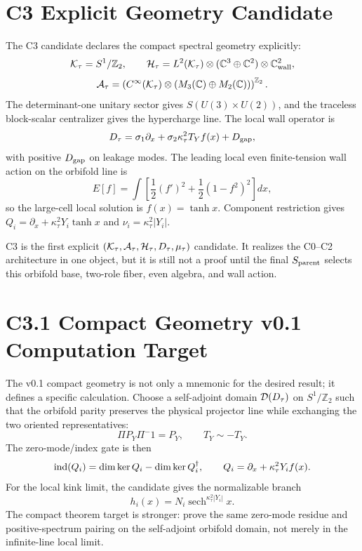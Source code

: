 \documentclass[11pt]{article}
\begin{document}
\section{C3 Explicit Geometry Candidate}
The C3 candidate declares the compact spectral geometry explicitly:
\begin{equation}
{\cal K}_\tau=S^1/\mathbb Z_2,\qquad
{\cal H}_\tau=
L^2({\cal K}_\tau)\otimes
(\mathbb C^3\oplus\mathbb C^2)\otimes\mathbb C^2_{\rm wall},
\end{equation}
\begin{equation}
{\cal A}_\tau=
\left(C^\infty({\cal K}_\tau)\otimes
(M_3(\mathbb C)\oplus M_2(\mathbb C))\right)^{\mathbb Z_2} .
\end{equation}
The determinant-one unitary sector gives $S(U(3)\times U(2))$, and the
traceless block-scalar centralizer gives the hypercharge line.  The local wall
operator is
\begin{equation}
D_\tau=\sigma_1\partial_x+\sigma_2\kappa_\tau^2T_Y f(x)+D_{\rm gap},
\end{equation}
with positive $D_{\rm gap}$ on leakage modes.  The leading local even
finite-tension wall action on the orbifold line is
\begin{equation}
E[f]=\int\left[\frac12(f')^2+\frac12(1-f^2)^2\right]dx,
\end{equation}
so the large-cell local solution is $f(x)=\tanh x$.  Component restriction gives
$Q_i=\partial_x+\kappa_\tau^2Y_i\tanh x$ and
$\nu_i=\kappa_\tau^2|Y_i|$.

C3 is the first explicit $({\cal K}_\tau,{\cal A}_\tau,{\cal H}_\tau,D_\tau,\mu_\tau)$
candidate.  It realizes the C0--C2 architecture in one object, but it is still
not a proof until the final $S_{\rm parent}$ selects this orbifold base,
two-role fiber, even algebra, and wall action.

\section{C3.1 Compact Geometry v0.1 Computation Target}
The v0.1 compact geometry is not only a mnemonic for the desired result; it
defines a specific calculation.  Choose a self-adjoint domain
${\cal D}(D_\tau)$ on $S^1/\mathbb Z_2$ such that the orbifold parity
preserves the physical projector line while exchanging the two oriented
representatives:
\begin{equation}
\Pi P_Y\Pi^-1=P_Y,\qquad
T_Y\sim -T_Y .
\end{equation}
The zero-mode/index gate is then
\begin{equation}
{\rm ind}(Q_i)=\dim\ker Q_i-\dim\ker Q_i^\dagger,
\qquad
Q_i=\partial_x+\kappa_\tau^2Y_i f(x).
\end{equation}
For the local kink limit, the candidate gives the normalizable branch
\begin{equation}
h_i(x)=N_i\operatorname{sech}^{\kappa_\tau^2|Y_i|}x .
\end{equation}
The compact theorem target is stronger: prove the same zero-mode residue and
positive-spectrum pairing on the self-adjoint orbifold domain, not merely in
the infinite-line local limit.
\end{document}
